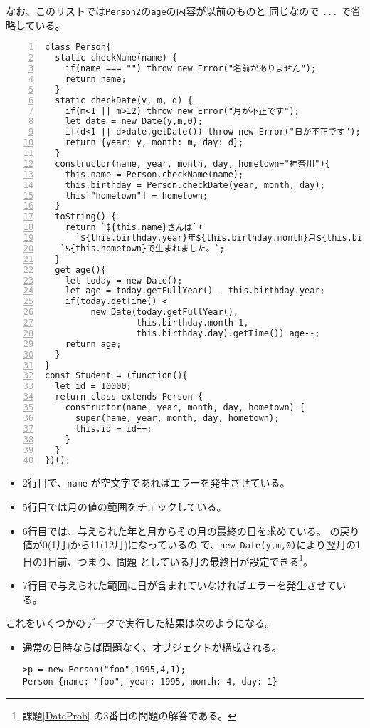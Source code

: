 \begin{Exec}
\begin{Exec}
	なお、このリストでは\texttt{Person2}の\texttt{age}の内容が以前のものと
	同じなので \texttt{...} で省略している。
 \end{Exec}
\begin{Verbatim}[numbers=left]
class Person{
  static checkName(name) {
    if(name === "") throw new Error("名前がありません");
    return name;
  }
  static checkDate(y, m, d) {
    if(m<1 || m>12) throw new Error("月が不正です");
    let date = new Date(y,m,0);
    if(d<1 || d>date.getDate()) throw new Error("日が不正です");
    return {year: y, month: m, day: d};
  }
  constructor(name, year, month, day, hometown="神奈川"){
    this.name = Person.checkName(name);
    this.birthday = Person.checkDate(year, month, day);
    this["hometown"] = hometown;
  }
  toString() {
    return `${this.name}さんは`+
      `${this.birthday.year}年${this.birthday.month}月${this.birthday.day}日に}` +
   `${this.hometown}で生まれました。`;
  }
  get age(){
    let today = new Date();
    let age = today.getFullYear() - this.birthday.year;
    if(today.getTime() <
         new Date(today.getFullYear(),
                  this.birthday.month-1,
                  this.birthday.day).getTime()) age--;
    return age;
  }
}
const Student = (function(){
  let id = 10000;
  return class extends Person {
    constructor(name, year, month, day, hometown) {
      super(name, year, month, day, hometown);
      this.id = id++;
    }
  }
})();
\end{Verbatim}
\begin{itemize}
 \item 2行目で、\texttt{name} が空文字であればエラーを発生させている。
 \item 5行目では月の値の範囲をチェックしている。
 \item 6行目では、与えられた年と月からその月の最終の日を求めている。
			 の戻り値が0(1月)から11(12月)になっているの
			 で、\texttt{new Date(y,m,0)}により翌月の1日の1日前、つまり、問題
			 としている月の最終日が設定できる\footnote{課題\ref{DateProb}
			 の3番目の問題の解答である。}。
 \item 7行目で与えられた範囲に日が含まれていなければエラーを発生させてい
			 る。
\end{itemize}
これをいくつかのデータで実行した結果は次のようになる。
\begin{itemize}
 \item 通常の日時ならば問題なく、オブジェクトが構成される。
\begin{Verbatim}
>p = new Person("foo",1995,4,1);
Person {name: "foo", year: 1995, month: 4, day: 1}

\end{Verbatim}
\end{itemize}
\end{Exec}
